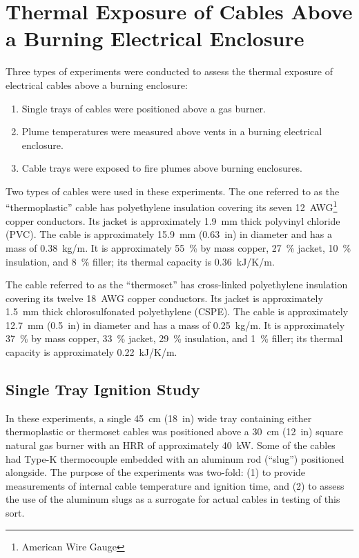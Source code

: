 \clearpage

\section{Thermal Exposure of Cables Above a Burning Electrical Enclosure}
\label{Sec:Cables}
Three types of experiments were conducted to assess the thermal exposure of electrical cables above a burning enclosure:
\begin{enumerate}
\item Single trays of cables were positioned above a gas burner.
\item Plume temperatures were measured above vents in a burning electrical enclosure.
\item Cable trays were exposed to fire plumes above burning enclosures.
\end{enumerate}
Two types of cables were used in these experiments. The one referred to as the ``thermoplastic'' cable has polyethylene insulation covering its seven 12~AWG\footnote{American Wire Gauge} copper conductors. Its jacket is approximately 1.9~mm thick polyvinyl chloride (PVC). The cable is approximately 15.9~mm (0.63~in) in diameter and has a mass of 0.38~kg/m. It is approximately 55~\% by mass copper, 27~\% jacket, 10~\% insulation, and 8~\% filler; its thermal capacity is 0.36~kJ/K/m.

The cable referred to as the ``thermoset'' has cross-linked polyethylene insulation covering its twelve 18~AWG copper conductors. Its jacket is approximately 1.5~mm thick chlorosulfonated polyethylene (CSPE). The cable is approximately 12.7~mm (0.5~in) in diameter and has a mass of 0.25~kg/m. It is approximately 37~\% by mass copper, 33~\% jacket, 29~\% insulation, and 1~\% filler; its thermal capacity is approximately 0.22~kJ/K/m.

\subsection{Single Tray Ignition Study}

In these experiments, a single 45~cm (18~in) wide tray containing either thermoplastic or thermoset cables was positioned above a 30~cm (12~in) square natural gas burner with an HRR of approximately 40~kW. Some of the cables had Type-K thermocouple embedded with an aluminum rod (``slug'') positioned alongside. The purpose of the experiments was two-fold: (1) to provide measurements of internal cable temperature and ignition time, and (2) to assess the use of the aluminum slugs as a surrogate for actual cables in testing of this sort.



